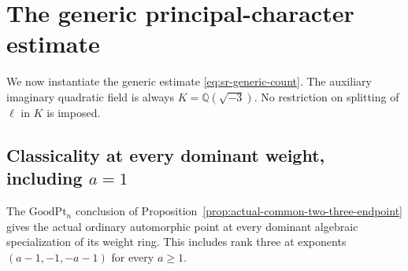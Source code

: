 \section{The generic principal-character estimate}
\label{sec:generic-character-complete-assembly}

We now instantiate the generic estimate
\eqref{eq:sr-generic-count}.
The auxiliary imaginary quadratic field is always
\(K=\mathbb Q(\sqrt{-3})\).
No restriction on splitting of \(\ell\) in \(K\)
is imposed.

\subsection{Classicality at every dominant weight, including \(a=1\)}
\begin{srlemma}\label{lem:sr-good-point-classical-all-dominant}
The \(\mathrm{GoodPt}_n\) conclusion of
Proposition~\ref{prop:actual-common-two-three-endpoint}
gives the actual ordinary automorphic point at every
dominant algebraic specialization of its weight ring.
This includes rank three at exponents
\((a-1,-1,-a-1)\) for every \(a\ge1\).
\end{srlemma}
